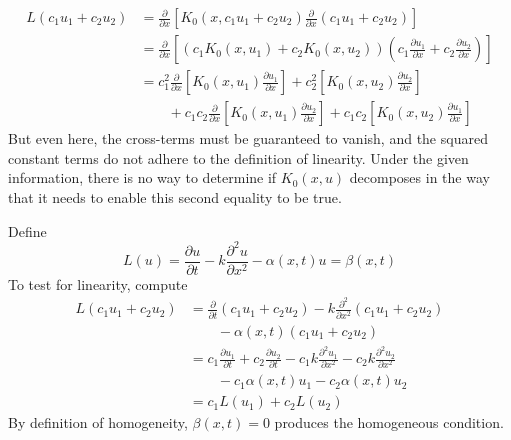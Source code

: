\documentclass[a4paper]{article}
\begin{document}
\begin{enumerate}[label=(\alph*)]
	\begin{align*}
		L \!\left( c_{1}u_{1} + c_{2}u_{2} \right) & = \frac{\partial }{\partial x}\!\left[ K_{0}\!\left( x, c_{1}u_{1} + c_{2}u_{2} \right)\frac{\partial }{\partial x}\!\left( c_{1}u_{1} + c_{2}u_{2} \right) \right] \\
		 & = \frac{\partial }{\partial x}\!\left[ \!\left( c_{1}K_{0}\!\left( x,u_{1} \right) + c_{2}K_{0}\!\left( x,u_{2} \right) \right) \!\left( c_{1}\frac{\partial u_{1}}{\partial x} + c_{2}\frac{\partial u_{2}}{\partial x} \right) \right] \\
		 & = c^{2}_{1}\frac{\partial }{\partial x}\!\left[ K_{0}\!\left( x,u_{1} \right)\frac{\partial u_{1}}{\partial x} \right] + c^{2}_{2}\!\left[ K_{0}\!\left( x,u_{2} \right)\frac{\partial u_{2}}{\partial x} \right] \\ 
		 & \qquad + c_{1}c_{2}\frac{\partial }{\partial x}\!\left[ K_{0}\!\left( x,u_{1} \right)\frac{\partial u_{2}}{\partial x} \right] + c_{1}c_{2}\!\left[ K_{0}\!\left( x,u_{2} \right)\frac{\partial u_{1}}{\partial x} \right]
	\end{align*}
	But even here, the cross-terms must be guaranteed to vanish, and the squared constant terms do not adhere to the definition of linearity.
	Under the given information, there is no way to determine if \( K_{0}\!\left( x,u \right) \) decomposes in the way that it needs to enable this second equality to be true.
\end{enumerate}


Define
\[
	L \!\left( u \right) = \frac{\partial u}{\partial t} - k \frac{\partial^2 u}{\partial x^2} - \alpha \!\left( x,t \right)u = \beta \!\left( x,t \right)
\]
To test for linearity, compute
\begin{align*}
	L \!\left( c_{1}u_{1} + c_{2}u_{2} \right) & = \frac{\partial }{\partial t}\!\left( c_{1}u_{1} + c_{2}u_{2} \right) - k \frac{\partial^2 }{\partial x^2}\!\left( c_{1}u_{1} + c_{2}u_{2} \right) \\
						   & \qquad - \alpha \!\left( x,t \right) \!\left( c_{1}u_{1} + c_{2}u_{2} \right) \\
	 & = c_{1}\frac{\partial u_{1}}{\partial t} + c_{2}\frac{\partial u_{2}}{\partial t} - c_{1}k \frac{\partial^2 u_{1}}{\partial x^2} - c_{2}k \frac{\partial^2 u_{2}}{\partial x^2} \\ 
	 & \qquad -c_{1}\alpha \!\left( x,t \right)u_{1} - c_{2}\alpha \!\left( x,t \right)u_{2} \\
	 & = c_{1}L \!\left( u_{1} \right) + c_{2}L \!\left( u_{2} \right)
\end{align*}
By definition of homogeneity, \( \beta \!\left( x,t \right) = 0 \) produces the homogeneous condition.
\end{document}
